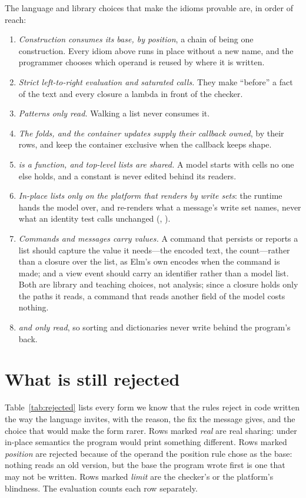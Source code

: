 The language and library choices that make the idioms provable are, in order of reach:
\begin{enumerate}
\item \emph{Construction consumes its base, by position}, a chain of \code{++} being one construction.
Every idiom above runs in place without a new name, and the programmer chooses which operand is reused
by where it is written.
\item \emph{Strict left-to-right evaluation and saturated calls.} They make ``before'' a fact of the text
and every closure a lambda in front of the checker.
\item \emph{Patterns only read.} Walking a list never consumes it.
\item \emph{The folds,  and the container updates supply their callback owned}, by their rows,
and keep the container exclusive when the callback keeps shape.
\item \emph{ is a function, and top-level lists are shared.} A model starts with cells no one
else holds, and a constant is never edited behind its readers.
\item \emph{In-place lists only on the platform that renders by write sets}: the runtime hands the model
over, and re-renders what a message's write set names, never what an identity test calls unchanged
(, ).
\item \emph{Commands and messages carry values.} A command that persists or reports a list should
capture the value it needs---the encoded text, the count---rather than a closure over the list, as Elm's
own  encodes when the command is made; and a view event should carry an identifier
rather than a model list. Both are library and teaching choices, not analysis; since a closure holds only
the paths it reads, a command that reads another field of the model costs nothing.
\item \emph{ and  only read}, so sorting and dictionaries never write behind the
program's back.
\end{enumerate}

\section{What is still rejected}
\label{sec:idioms-rejected}

Table~\ref{tab:rejected} lists every form we know that the rules reject in code written the way the
language invites, with the reason, the fix the message gives, and the choice that would make the form
rarer. Rows marked \emph{real} are real sharing: under in-place semantics the program would print
something different. Rows marked \emph{position} are rejected because of the operand the position rule
chose as the base: nothing reads an old version, but the base the program wrote first is one that may
not be written. Rows marked \emph{limit} are the checker's or the platform's blindness. The evaluation
counts each row separately.


